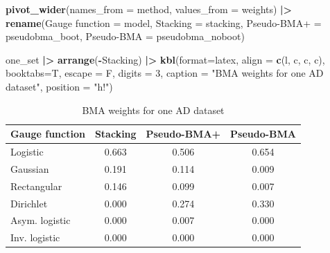 \documentclass[
]{article}
\newenvironment{Shaded}{\begin{snugshade}}{\end{snugshade}}
\newcommand{\AttributeTok}[1]{\textcolor[rgb]{0.13,0.29,0.53}{#1}}
\newcommand{\DecValTok}[1]{\textcolor[rgb]{0.00,0.00,0.81}{#1}}
\newcommand{\FunctionTok}[1]{\textcolor[rgb]{0.13,0.29,0.53}{\textbf{#1}}}
\newcommand{\NormalTok}[1]{#1}
\newcommand{\OtherTok}[1]{\textcolor[rgb]{0.56,0.35,0.01}{#1}}
\newcommand{\SpecialCharTok}[1]{\textcolor[rgb]{0.81,0.36,0.00}{\textbf{#1}}}
\newcommand{\StringTok}[1]{\textcolor[rgb]{0.31,0.60,0.02}{#1}}
\begin{document}
\begin{Shaded}
\begin{Highlighting}[]
  \FunctionTok{pivot\_wider}\NormalTok{(}\AttributeTok{names\_from =}\NormalTok{ method, }\AttributeTok{values\_from =}\NormalTok{ weights) }\SpecialCharTok{|\textgreater{}}
  \FunctionTok{rename}\NormalTok{(}\StringTok{\textquotesingle{}Gauge function\textquotesingle{}} \OtherTok{=}\NormalTok{ model, }\StringTok{\textquotesingle{}Stacking\textquotesingle{}} \OtherTok{=}\NormalTok{ stacking, }\StringTok{\textquotesingle{}Pseudo{-}BMA+\textquotesingle{}} \OtherTok{=}\NormalTok{ pseudobma\_boot, }\StringTok{\textquotesingle{}Pseudo{-}BMA\textquotesingle{}} \OtherTok{=}\NormalTok{ pseudobma\_noboot)}

\NormalTok{one\_set }\SpecialCharTok{|\textgreater{}} \FunctionTok{arrange}\NormalTok{(}\SpecialCharTok{{-}}\NormalTok{Stacking) }\SpecialCharTok{|\textgreater{}} \FunctionTok{kbl}\NormalTok{(}\AttributeTok{format=}\StringTok{\textquotesingle{}latex\textquotesingle{}}\NormalTok{, }\AttributeTok{align =} \FunctionTok{c}\NormalTok{(}\StringTok{\textquotesingle{}l\textquotesingle{}}\NormalTok{, }\StringTok{\textquotesingle{}c\textquotesingle{}}\NormalTok{, }\StringTok{\textquotesingle{}c\textquotesingle{}}\NormalTok{, }\StringTok{\textquotesingle{}c\textquotesingle{}}\NormalTok{), }\AttributeTok{booktabs=}\NormalTok{T, }\AttributeTok{escape =}\NormalTok{ F, }\AttributeTok{digits =} \DecValTok{3}\NormalTok{, }
      \AttributeTok{caption =} \StringTok{"BMA weights for one AD dataset"}\NormalTok{, }\AttributeTok{position =} \StringTok{"h!"}\NormalTok{)}
\end{Highlighting}
\end{Shaded}

\begin{table}[h!]

\caption{\label{tab:unnamed-chunk-1}BMA weights for one AD dataset}
\centering
\begin{tabular}[t]{lccc}
\toprule
Gauge function & Stacking & Pseudo-BMA+ & Pseudo-BMA\\
\midrule
Logistic & 0.663 & 0.506 & 0.654\\
Gaussian & 0.191 & 0.114 & 0.009\\
Rectangular & 0.146 & 0.099 & 0.007\\
Dirichlet & 0.000 & 0.274 & 0.330\\
Asym. logistic & 0.000 & 0.007 & 0.000\\
\addlinespace
Inv. logistic & 0.000 & 0.000 & 0.000\\
\bottomrule
\end{tabular}
\end{table}
\end{document}
